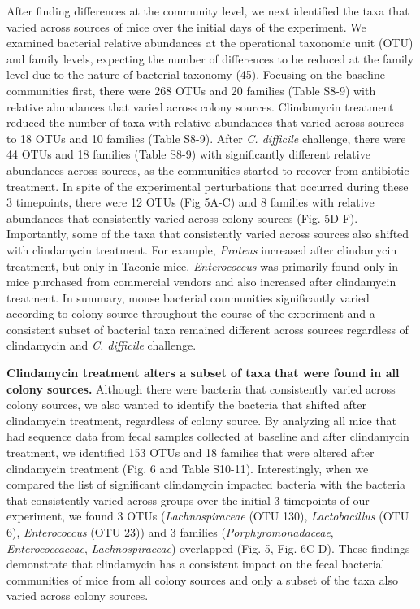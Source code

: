 \documentclass[11pt,]{article}
\begin{document}
After finding differences at the community level, we next identified the
taxa that varied across sources of mice over the initial days of the
experiment. We examined bacterial relative abundances at the operational
taxonomic unit (OTU) and family levels, expecting the number of
differences to be reduced at the family level due to the nature of
bacterial taxonomy (45). Focusing on the baseline communities first,
there were 268 OTUs and 20 families (Table S8-9) with relative
abundances that varied across colony sources. Clindamycin treatment
reduced the number of taxa with relative abundances that varied across
sources to 18 OTUs and 10 families (Table S8-9). After \emph{C.
difficile} challenge, there were 44 OTUs and 18 families (Table S8-9)
with significantly different relative abundances across sources, as the
communities started to recover from antibiotic treatment. In spite of
the experimental perturbations that occurred during these 3 timepoints,
there were 12 OTUs (Fig 5A-C) and 8 families with relative abundances
that consistently varied across colony sources (Fig. 5D-F). Importantly,
some of the taxa that consistently varied across sources also shifted
with clindamycin treatment. For example, \emph{Proteus} increased after
clindamycin treatment, but only in Taconic mice. \emph{Enterococcus} was
primarily found only in mice purchased from commercial vendors and also
increased after clindamycin treatment. In summary, mouse bacterial
communities significantly varied according to colony source throughout
the course of the experiment and a consistent subset of bacterial taxa
remained different across sources regardless of clindamycin and \emph{C.
difficile} challenge.

\textbf{Clindamycin treatment alters a subset of taxa that were found in
all colony sources.} Although there were bacteria that consistently
varied across colony sources, we also wanted to identify the bacteria
that shifted after clindamycin treatment, regardless of colony source.
By analyzing all mice that had sequence data from fecal samples
collected at baseline and after clindamycin treatment, we identified 153
OTUs and 18 families that were altered after clindamycin treatment (Fig.
6 and Table S10-11). Interestingly, when we compared the list of
significant clindamycin impacted bacteria with the bacteria that
consistently varied across groups over the initial 3 timepoints of our
experiment, we found 3 OTUs (\emph{Lachnospiraceae} (OTU 130),
\emph{Lactobacillus} (OTU 6), \emph{Enterococcus} (OTU 23)) and 3
families (\emph{Porphyromonadaceae}, \emph{Enterococcaceae},
\emph{Lachnospiraceae}) overlapped (Fig. 5, Fig. 6C-D). These findings
demonstrate that clindamycin has a consistent impact on the fecal
bacterial communities of mice from all colony sources and only a subset
of the taxa also varied across colony sources.
\end{document}
